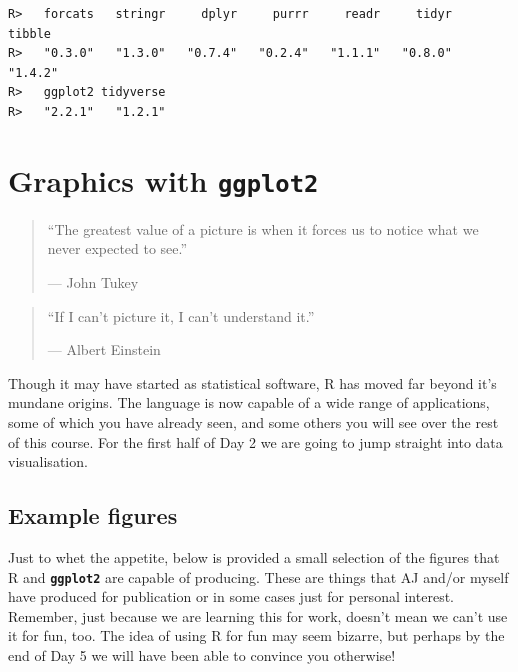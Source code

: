\documentclass[]{book}
\newenvironment{Shaded}{\begin{snugshade}}{\end{snugshade}}
\newcommand{\KeywordTok}[1]{\textcolor[rgb]{0.13,0.29,0.53}{\textbf{#1}}}
\newcommand{\StringTok}[1]{\textcolor[rgb]{0.31,0.60,0.02}{#1}}
\newcommand{\OperatorTok}[1]{\textcolor[rgb]{0.81,0.36,0.00}{\textbf{#1}}}
\newcommand{\NormalTok}[1]{#1}
\theoremstyle{definition}
\theoremstyle{definition}
\theoremstyle{definition}
\theoremstyle{remark}
\begin{document}
\begin{Shaded}
\end{Shaded}

\begin{verbatim}
R>   forcats   stringr     dplyr     purrr     readr     tidyr    tibble 
R>   "0.3.0"   "1.3.0"   "0.7.4"   "0.2.4"   "1.1.1"   "0.8.0"   "1.4.2" 
R>   ggplot2 tidyverse 
R>   "2.2.1"   "1.2.1"
\end{verbatim}

\chapter{\texorpdfstring{Graphics with
\textbf{\texttt{ggplot2}}}{Graphics with ggplot2}}\label{graphics}

\begin{quote}
``The greatest value of a picture is when it forces us to notice what we
never expected to see.''

--- John Tukey
\end{quote}

\begin{quote}
``If I can't picture it, I can't understand it.''

--- Albert Einstein
\end{quote}

Though it may have started as statistical software, R has moved far
beyond it's mundane origins. The language is now capable of a wide range
of applications, some of which you have already seen, and some others
you will see over the rest of this course. For the first half of Day 2
we are going to jump straight into data visualisation.

\section{Example figures}\label{example-figures}

Just to whet the appetite, below is provided a small selection of the
figures that R and \textbf{\texttt{ggplot2}} are capable of producing.
These are things that AJ and/or myself have produced for publication or
in some cases just for personal interest. Remember, just because we are
learning this for work, doesn't mean we can't use it for fun, too. The
idea of using R for fun may seem bizarre, but perhaps by the end of Day
5 we will have been able to convince you otherwise!
\end{document}
